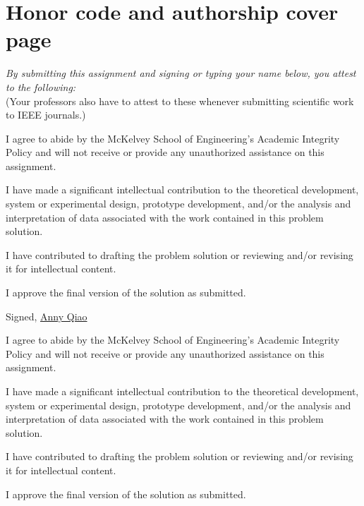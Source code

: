 \documentclass[11pt,letterpaper]{article}
\begin{document}
\section*{Honor code and authorship cover page}

\noindent \textit{By submitting this assignment and signing or typing your name below, you attest to the following:} \\
(Your professors also have to attest to these whenever submitting scientific work to IEEE journals.)

\begin{todolist}[label={\checkmark}]
    \item I agree to abide by the McKelvey School of Engineering's Academic Integrity Policy and will not receive or provide any unauthorized assistance on this assignment.
    \item I have made a significant intellectual contribution to the theoretical development, system or experimental design, prototype development, and/or the analysis and interpretation of data associated with the work contained in this problem solution.
    \item I have contributed to drafting the problem solution or reviewing and/or revising it for intellectual content.
    \item I approve the final version of the solution as submitted.
\end{todolist}

\vspace{10pt}

\noindent Signed, \underline{Anny Qiao}

\begin{todolist}[label={\checkmark}]
    \item I agree to abide by the McKelvey School of Engineering's Academic Integrity Policy and will not receive or provide any unauthorized assistance on this assignment.
    \item I have made a significant intellectual contribution to the theoretical development, system or experimental design, prototype development, and/or the analysis and interpretation of data associated with the work contained in this problem solution.
    \item I have contributed to drafting the problem solution or reviewing and/or revising it for intellectual content.
    \item I approve the final version of the solution as submitted.
\end{todolist}
\end{document}
